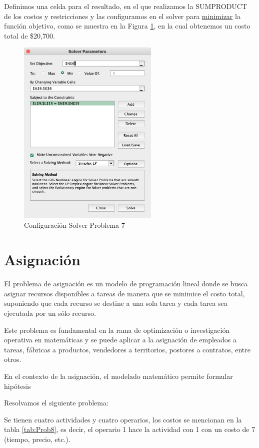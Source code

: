 \documentclass[12pt]{article}  %
\begin{document}
Definimos una celda para el resultado, en el que realizamos la SUMPRODUCT de los costos y restricciones y las configuramos en el solver para \underline{minimizar} la función objetivo, como se muestra en la Figura \ref{fig:configSolverProb7}, en la cual obtenemos un costo total de \$20,700.

\begin{figure}[H]
\centering
\caption{Configuración Solver Problema 7}
\label{fig:configSolverProb7}
\includegraphics[width=0.6\textwidth]{configSolverProb7.png}
\end{figure}

\section{Asignación}
El problema de asignación es un modelo de programación lineal donde se busca asignar recursos disponibles a tareas de manera que se minimice el costo total, suponiendo que cada recurso se destine a una sola tarea y cada tarea sea ejecutada por un sólo recurso.

Este problema es fundamental en la rama de optimización o investigación operativa en matemáticas y se puede aplicar a la asignación de empleados a tareas, fábricas a productos, vendedores a territorios, postores a contratos, entre otros.

En el contexto de la asignación, el modelado matemático permite formular hipótesis 

Resolvamos el siguiente problema:

Se tienen cuatro actividades y cuatro operarios, los costos se mencionan en la tabla \ref{tab:Prob8}, es decir, el operario 1 hace la actividad con 1 con un costo de 7 (tiempo, precio, etc.).
\end{document}
